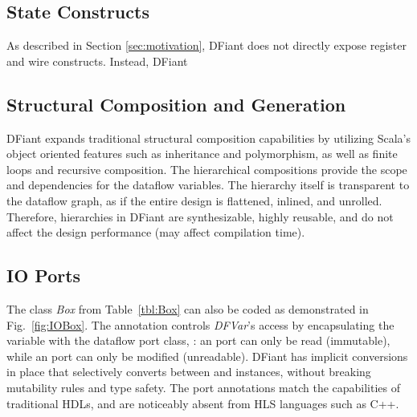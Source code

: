 \subsection{State Constructs}
As described in Section \ref{sec:motivation}, DFiant does not directly expose register and wire constructs. Instead, DFiant 

\subsection{Structural Composition and Generation}
DFiant expands traditional structural composition capabilities by utilizing Scala's object oriented features such as inheritance and polymorphism, as well as finite loops and recursive composition. The hierarchical compositions provide the scope and dependencies for the dataflow variables. The hierarchy itself is transparent to the dataflow graph, as if the entire design is flattened, inlined, and unrolled. Therefore, hierarchies in DFiant are synthesizable, highly reusable, and do not affect the design performance (may affect compilation time).

%

\subsection{IO Ports}
\label{sec:io_ports}
The class \textit{Box} from Table~\ref{tbl:Box} can also be coded as demonstrated in Fig.~\ref{fig:IOBox}. The annotation  controls \textit{DFVar}'s access by encapsulating the variable with the dataflow port class, : an  port can only be read (immutable), while an  port can only be modified (unreadable). DFiant has implicit conversions in place that selectively converts between  and  instances, without breaking mutability rules and type safety. The port annotations match the capabilities of traditional HDLs, and are noticeably absent from HLS languages such as C++. 






